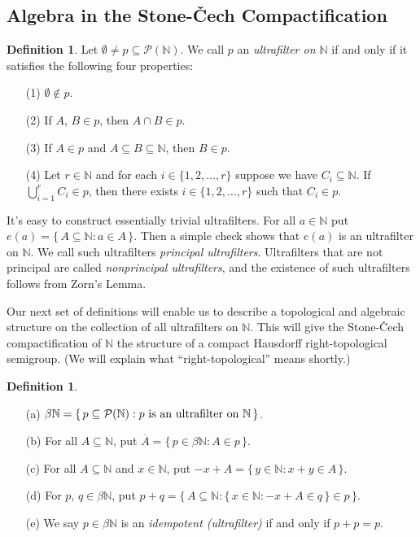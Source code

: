 \documentclass[12pt]{article}
\theoremstyle{plain}
\theoremstyle{definition}
\newtheorem{defn}[thm]{Definition}
\newcommand{\bbN}{\mathbb{N}}
\begin{document}
\subsection{Algebra in the Stone-\v{C}ech Compactification}
\begin{defn}
  \label{defn:uf}
  Let $\emptyset \ne p \subseteq \mathcal{P}(\bbN)$.
  We call $p$ an \textsl{ultrafilter on $\bbN$} if and only if it
  satisfies the following four properties:
  \begin{itemize}
    \item[(1)] $\emptyset \not\in p$.
    \item[(2)] If $A$, $B \in p$, then $A \cap B \in p$.
    \item[(3)] If $A \in p$ and $A \subseteq B \subseteq \bbN$,
      then $B \in p$.
    \item[(4)] Let $r \in \bbN$ and for each $i \in \{1, 2,
      \ldots, r\}$ suppose we have $C_i \subseteq \bbN$. 
      If $\bigcup_{i=1}^r C_i \in p$, then there exists $i \in
      \{1, 2, \ldots, r\}$ such that $C_i \in p$.
  \end{itemize}
\end{defn}

It's easy to construct essentially trivial ultrafilters. 
For all $a \in \bbN$ put $e(a) = \{\, A \subseteq \bbN : a \in A
\,\}$.
Then a simple check shows that $e(a)$ is an ultrafilter on $\bbN$.
We call such ultrafilters \textsl{principal ultrafilters}. 
Ultrafilters that are not principal are called \textsl{nonprincipal
  ultrafilters}, and the existence of such ultrafilters follows from
Zorn's Lemma. 

Our next set of definitions will enable us to describe a topological
and algebraic structure on the collection of all ultrafilters on $\bbN$.
This will give the Stone-\v{C}ech compactification of $\bbN$ the
structure of a compact Hausdorff right-topological semigroup. 
(We will explain what ``right-topological'' means shortly.)
\begin{defn}
  \label{defn:alg}
  \begin{itemize}
    \item[(a)] $\beta\bbN = \{\, p \subseteq \mathcal{P}(\bbN) :
      \hbox{$p$ is an ultrafilter on
      $\bbN$} \,\}$.
    \item[(b)] For all $A \subseteq \bbN$, put $\overline{A} = \{\,
      p \in \beta\bbN : A \in p \,\}$.
    \item[(c)] For all $A \subseteq \bbN$ and $x \in \bbN$, put
      $-x+A = \{\, y \in \bbN : x+y \in A \,\}$.
    \item[(d)] For $p$, $q \in \beta\bbN$, put
      $p+q = \bigl\{\, A \subseteq \bbN : \{\, x \in \bbN : -x +A \in q
      \,\} \in p \,\bigr\}$.
    \item[(e)] We say $p \in \beta\bbN$ is an \textsl{idempotent
        (ultrafilter)} if  and only if $p + p = p$.
  \end{itemize}
\end{defn}
\end{document}
